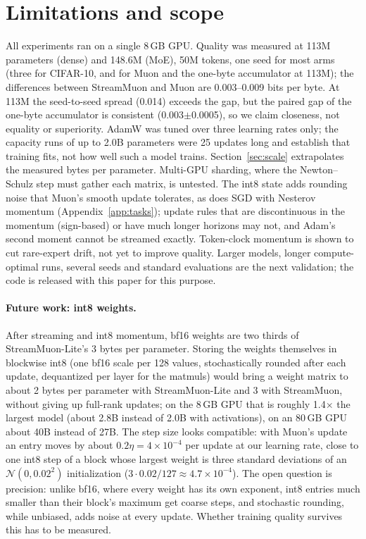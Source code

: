 \documentclass[10pt]{article}
\newcommand{\method}{StreamMuon}\newcommand{\lite}{StreamMuon-Lite}
\begin{document}
\section{Limitations and scope}
\label{sec:limits}
All experiments ran on a single 8\,GB GPU. Quality was measured at 113M parameters (dense) and 148.6M (MoE), 50M tokens,
one seed for most arms (three for CIFAR-10, and for Muon and the one-byte accumulator at 113M); the differences between
\method{} and Muon are 0.003--0.009 bits per byte. At 113M the seed-to-seed spread (0.014) exceeds the gap, but the
paired gap of the one-byte accumulator is consistent (0.003$\pm$0.0005), so we claim closeness, not equality or
superiority. AdamW was tuned over three learning rates only; the capacity runs of up to 2.0B parameters were 25
updates long and establish that training fits, not how well such a model trains. Section~\ref{sec:scale} extrapolates
the measured bytes per parameter. Multi-GPU sharding, where the Newton--Schulz step must gather each matrix, is
untested. The int8 state adds rounding noise that Muon's smooth update tolerates, as does SGD with Nesterov momentum
(Appendix~\ref{app:tasks}); update rules that are discontinuous
in the momentum (sign-based) or have much longer horizons may not, and Adam's second moment cannot be streamed exactly.
Token-clock momentum is shown to cut rare-expert drift, not yet to improve quality. Larger models, longer
compute-optimal runs, several seeds and standard evaluations are the next validation; the code is released with
this paper for this purpose.

\paragraph{Future work: int8 weights.} After streaming and int8 momentum, bf16 weights are two thirds of \lite{}'s
3 bytes per parameter. Storing the weights themselves in blockwise int8 (one bf16 scale per 128 values, stochastically
rounded after each update, dequantized per layer for the matmuls) would bring a weight matrix to about 2 bytes per
parameter with \lite{} and 3 with \method{}, without giving up full-rank updates; on the 8\,GB GPU that is roughly
1.4$\times$ the largest model (about 2.8B instead of 2.0B with activations), on an 80\,GB GPU about 40B instead of 27B.
The step size looks compatible: with Muon's update an entry moves by about $0.2\eta=4\times10^{-4}$ per update at our
learning rate, close to one int8 step of a block whose largest weight is three standard deviations of an
$\mathcal N(0,0.02^2)$ initialization ($3\cdot0.02/127\approx4.7\times10^{-4}$). The open question is precision: unlike
bf16, where every weight has its own exponent, int8 entries much smaller than their block's maximum get coarse
steps, and stochastic rounding, while unbiased, adds noise at every update. Whether training quality survives this
has to be measured.
\end{document}
